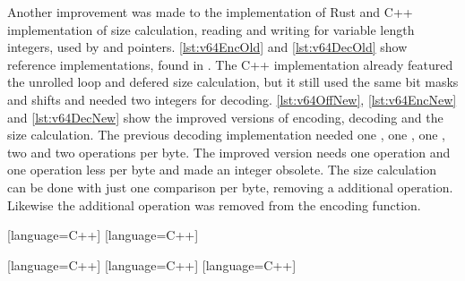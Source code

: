 \documentclass[thesis]{subfiles}
\begin{document}
  Another improvement was made to the implementation of Rust and C++ implementation of size calculation, reading and writing for variable length integers, used by  and pointers.
  \autoref{lst:v64EncOld} and \autoref{lst:v64DecOld} show reference implementations, found in \autocite{skill-tr}.
  The C++ implementation already featured the unrolled loop and defered size calculation, but it still used the same bit masks and shifts and needed two integers for decoding.
  \autoref{lst:v64OffNew}, \autoref{lst:v64EncNew} and \autoref{lst:v64DecNew} show the improved versions of encoding, decoding and the size calculation.
  The previous decoding implementation needed one , one , one , two  and two  operations per byte.
  The improved version needs one  operation and one  operation less per byte and made an integer obsolete.
  The size calculation can be done with just one comparison per byte, removing a additional  operation.
  Likewise the additional  operation was removed from the encoding function.

  [language=C++]
  [language=C++]


  [language=C++]
  [language=C++]
  [language=C++]
\end{document}
